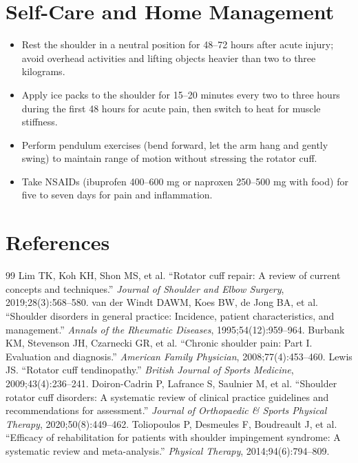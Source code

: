 \section*{Self-Care and Home Management}
\begin{itemize}
  \item Rest the shoulder in a neutral position for 48--72 hours after acute injury; avoid overhead activities and lifting objects heavier than two to three kilograms.
  \item Apply ice packs to the shoulder for 15--20 minutes every two to three hours during the first 48 hours for acute pain, then switch to heat for muscle stiffness.
  \item Perform pendulum exercises (bend forward, let the arm hang and gently swing) to maintain range of motion without stressing the rotator cuff.
  \item Take NSAIDs (ibuprofen 400--600 mg or naproxen 250--500 mg with food) for five to seven days for pain and inflammation.
\end{itemize}

\section*{References}
\begin{thebibliography}{99}
 Lim TK, Koh KH, Shon MS, et al. ``Rotator cuff repair: A review of current concepts and techniques.'' \textit{Journal of Shoulder and Elbow Surgery}, 2019;28(3):568--580.
 van der Windt DAWM, Koes BW, de Jong BA, et al. ``Shoulder disorders in general practice: Incidence, patient characteristics, and management.'' \textit{Annals of the Rheumatic Diseases}, 1995;54(12):959--964.
 Burbank KM, Stevenson JH, Czarnecki GR, et al. ``Chronic shoulder pain: Part I. Evaluation and diagnosis.'' \textit{American Family Physician}, 2008;77(4):453--460.
 Lewis JS. ``Rotator cuff tendinopathy.'' \textit{British Journal of Sports Medicine}, 2009;43(4):236--241.
 Doiron-Cadrin P, Lafrance S, Saulnier M, et al. ``Shoulder rotator cuff disorders: A systematic review of clinical practice guidelines and recommendations for assessment.'' \textit{Journal of Orthopaedic \& Sports Physical Therapy}, 2020;50(8):449--462.
 Toliopoulos P, Desmeules F, Boudreault J, et al. ``Efficacy of rehabilitation for patients with shoulder impingement syndrome: A systematic review and meta-analysis.'' \textit{Physical Therapy}, 2014;94(6):794--809.
\end{thebibliography}
